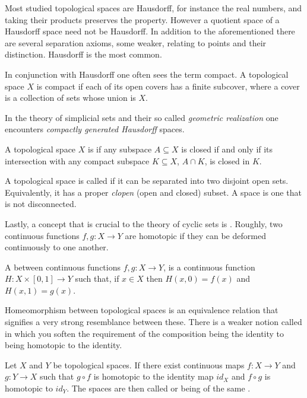 \documentclass[../../main.tex]{subfiles}
\begin{document}
    Most studied topological spaces are Hausdorff, for instance the real numbers, and taking their products preserves the property. However a quotient space of a Hausdorff space need not be Hausdorff. In addition to the aforementioned there are several separation axioms, some weaker, relating to points and their distinction. Hausdorff is the most common.
    
    In conjunction with Hausdorff one often sees the term compact. A topological space $X$ is compact if each of its open covers has a finite subcover, where a cover is a collection of sets whose union is $X$.

    In the theory of simplicial sets and their so called \textit{geometric realization} one encounters \textit{compactly generated Hausdorff} spaces.

    \begin{definition}
        A topological space $X$ is  if any subspace $A \subseteq X$ is closed if and only if its intersection with any compact subspace $K \subseteq X$, $A \cap K$, is closed in $K$.
    \end{definition}

    A topological space is called  if it can be separated into two disjoint open sets. Equivalently, it has a proper \emph{clopen} (open and closed) subset. A  space is one that is not disconnected.

    Lastly, a concept that is crucial to the theory of cyclic sets is . Roughly, two continuous functions $f, g: X \to Y$ are homotopic if they can be deformed continuously to one another.

    \begin{definition}
        A  between continuous functions $f,g: X\to Y$, is a continuous function  $H : X \times [0,1] \to Y$ such that, if $x \in X$ then $H(x,0) = f(x)$ and $H(x,1) = g(x)$.
    \end{definition}

    Homeomorphism between topological spaces is an equivalence relation that signifies a very strong resemblance between these. There is a weaker notion called  in which you soften the requirement of the composition being the identity to being homotopic to the identity.

    \begin{definition}
        Let $X$ and $Y$ be topological spaces. If there exist continuous maps $f : X \to Y$ and $g : Y \to X$ such that $g \circ f$ is homotopic to the identity map $id_X$ and $f \circ g$ is homotopic to $id_Y$. The spaces are then called  or being of the same .
    \end{definition}
\end{document}
